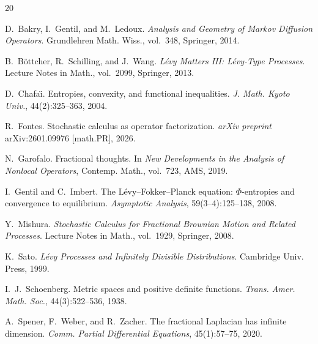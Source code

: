 \documentclass[11pt,a4paper]{article}
\theoremstyle{plain}
\theoremstyle{definition}
\theoremstyle{remark}
\begin{document}
\begin{thebibliography}{20}

D.~Bakry, I.~Gentil, and M.~Ledoux.
\newblock \emph{Analysis and Geometry of Markov Diffusion Operators}.
\newblock Grundlehren Math. Wiss., vol.~348, Springer, 2014.

B.~B\"ottcher, R.~Schilling, and J.~Wang.
\newblock \emph{L\'evy Matters III: L\'evy-Type Processes}.
\newblock Lecture Notes in Math., vol.~2099, Springer, 2013.

D.~Chafa\"{\i}.
\newblock Entropies, convexity, and functional inequalities.
\newblock \emph{J. Math. Kyoto Univ.}, 44(2):325--363, 2004.

R.~Fontes.
\newblock Stochastic calculus as operator factorization.
\newblock \emph{arXiv preprint} arXiv:2601.09976 [math.PR], 2026.

N.~Garofalo.
\newblock Fractional thoughts.
\newblock In \emph{New Developments in the Analysis of Nonlocal Operators},
  Contemp. Math., vol.~723, AMS, 2019.

I.~Gentil and C.~Imbert.
\newblock The {L}\'evy--{F}okker--{P}lanck equation: $\Phi$-entropies
  and convergence to equilibrium.
\newblock \emph{Asymptotic Analysis}, 59(3--4):125--138, 2008.

Y.~Mishura.
\newblock \emph{Stochastic Calculus for Fractional Brownian Motion
  and Related Processes}.
\newblock Lecture Notes in Math., vol.~1929, Springer, 2008.

K.~Sato.
\newblock \emph{L\'evy Processes and Infinitely Divisible Distributions}.
\newblock Cambridge Univ. Press, 1999.

I.~J.~Schoenberg.
\newblock Metric spaces and positive definite functions.
\newblock \emph{Trans. Amer. Math. Soc.}, 44(3):522--536, 1938.

A.~Spener, F.~Weber, and R.~Zacher.
\newblock The fractional {L}aplacian has infinite dimension.
\newblock \emph{Comm. Partial Differential Equations}, 45(1):57--75, 2020.

\end{thebibliography}
\end{document}

